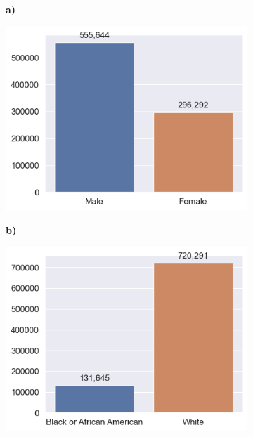 \begin{figure}[!htbp]

    \centering

    \begin{minipage}[b]{0.5\textwidth}
        \centering
        \begin{subfigure}[t]{0.06\textwidth}
            \textbf{a)}
        \end{subfigure}
        \begin{subfigure}[t]{0.9\textwidth}
            \includegraphics[width=\linewidth, valign=t]{images/HMDA_features/HMDA_features_sex.png}
        \end{subfigure}
    \end{minipage}%
    \begin{minipage}[b]{0.5\textwidth}
        \centering
        \begin{subfigure}[t]{0.06\textwidth}
            \textbf{b)}
        \end{subfigure}
        \begin{subfigure}[t]{0.9\textwidth}
            \includegraphics[width=\linewidth, valign=t]{images/HMDA_features/HMDA_features_race.png}

\end{subfigure}
\end{minipage}
\end{figure}
